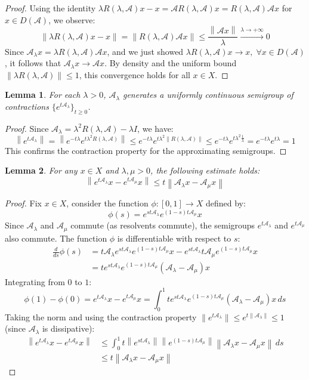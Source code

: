\documentclass[12pt, oneside]{book}
\newtheorem{lemma}{Lemma}[section]
\newcommand{\norm}[1]{\left\lVert#1\right\rVert}
\newcommand{\A}{\mathscr{A}}
\begin{document}
\begin{proof}
Using the identity $\lambda R(\lambda, \A)x - x = \A R(\lambda, \A)x = R(\lambda, \A)\A x$ for $x \in D(\A)$, we observe:
$$
\norm{\lambda R(\lambda, \A)x - x } = \norm{ R(\lambda, \A)\A x } \le \frac{\norm{\A x}}{\lambda} \xrightarrow{\lambda \to +\infty} 0
$$
Since $\A_\lambda x = \lambda R(\lambda, \A)\A x$, and we just showed $\lambda R(\lambda, \A)x \to x, \; \forall x \in D(\A)$, it follows that $\A_\lambda x \to \A x$. By density and the uniform bound $\norm{\lambda R(\lambda, \A)} \le 1$, this convergence holds for all $x \in X$.
\end{proof}

\begin{lemma}
\label{hy:yosida_sg} For each $\lambda > 0$, $\A_\lambda$ generates a uniformly continuous semigroup of contractions $\{e^{t\A_\lambda}\}_{t \ge 0}$.
\end{lemma}
\begin{proof}
Since $\A_\lambda = \lambda^2 R(\lambda, \A) - \lambda I$, we have:
$$
	\norm{e^{t\A_\lambda}} = \norm{e^{-t\lambda} e^{t\lambda^2 R(\lambda, \A)}} \le e^{-t\lambda} e^{t\lambda^2 \norm{R(\lambda, \A)}} \le e^{-t\lambda} e^{t\lambda^2 \frac{1}{\lambda}} = e^{-t\lambda} e^{t\lambda} = 1
$$
This confirms the contraction property for the approximating semigroups.
\end{proof}

\begin{lemma} \label{hy:uc}
For any $x \in X$ and $\lambda, \mu > 0$, the following estimate holds:
$$
\norm{e^{t\A_\lambda}x - e^{t\A_\mu}x} \le t \norm{\A_\lambda x - \A_\mu x}
$$
\end{lemma}

\begin{proof}
Fix $x \in X$, consider the function $\phi: [0, 1] \to X$ defined by:
$$
\phi(s) = e^{s t \A_\lambda} e^{(1-s) t \A_\mu} x
$$
Since $\A_\lambda$ and $\A_\mu$ commute (as resolvents commute), the semigroups $e^{t\A_\lambda}$ and $e^{t\A_\mu}$ also commute. The function $\phi$ is differentiable with respect to $s$:
\begin{align*}
\frac{d}{ds} \phi(s) &= t \A_\lambda e^{s t \A_\lambda} e^{(1-s) t \A_\mu} x - e^{s t \A_\lambda} t \A_\mu e^{(1-s) t \A_\mu} x \\
&= t e^{s t \A_\lambda} e^{(1-s) t \A_\mu} (\A_\lambda - \A_\mu) x
\end{align*}
Integrating from $0$ to $1$:
$$
\phi(1) - \phi(0) = e^{t \A_\lambda}x - e^{t \A_\mu}x = \int_0^1 t e^{s t \A_\lambda} e^{(1-s) t \A_\mu} (\A_\lambda - \A_\mu) x \, ds
$$
Taking the norm and using the contraction property $\|e^{t \A_\lambda}\| \le e^{t \|\A_\lambda\|} \le 1$ (since $\A_\lambda$ is dissipative):
\begin{align*}
\norm{e^{t \A_\lambda}x - e^{t \A_\mu}x} &\le \int_0^1 t \norm{e^{s t \A_\lambda}} \norm{e^{(1-s) t \A_\mu}} \norm{\A_\lambda x - \A_\mu x} \, ds \\
&\le t \norm{\A_\lambda x - \A_\mu x}
\end{align*}
\end{proof}
\end{document}
